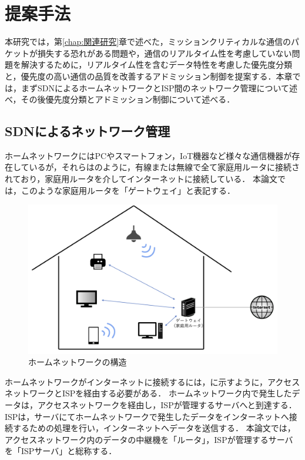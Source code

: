 \documentclass[a4paper,11pt,uplatex]{ujreport}
\begin{document}
\chapter{提案手法}
\label{chap:提案手法}

  本研究では，第\ref{chap:関連研究}章で述べた，ミッションクリティカルな通信のパケットが損失する恐れがある問題や，通信のリアルタイム性を考慮していない問題を解決するために，リアルタイム性を含むデータ特性を考慮した優先度分類と，優先度の高い通信の品質を改善するアドミッション制御を提案する．本章では，まずSDNによるホームネットワークとISP間のネットワーク管理について述べ，その後優先度分類とアドミッション制御について述べる．

\section{SDNによるネットワーク管理}
\label{sec:SDNによるネットワーク管理}

  ホームネットワークにはPCやスマートフォン，IoT機器など様々な通信機器が存在しているが，それらはのように，有線または無線で全て家庭用ルータに接続されており，家庭用ルータを介してインターネットに接続している．
  本論文では，このような家庭用ルータを「ゲートウェイ」と表記する．\par

  \begin{figure}[!b]
    \centering
    \includegraphics[width=\linewidth]{img/homenetwork.png}
    \caption{ホームネットワークの構造}
    \label{fig:homenetwork}
  \end{figure}

  ホームネットワークがインターネットに接続するには，に示すように，アクセスネットワークとISPを経由する必要がある．
  ホームネットワーク内で発生したデータは，アクセスネットワークを経由し，ISPが管理するサーバへと到達する．
  ISPは，サーバにてホームネットワークで発生したデータをインターネットへ接続するための処理を行い，インターネットへデータを送信する．
  本論文では，アクセスネットワーク内のデータの中継機を「ルータ」，ISPが管理するサーバを「ISPサーバ」と総称する．\par
\end{document}
